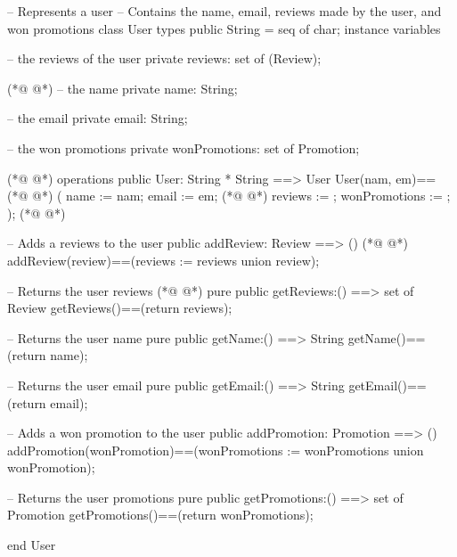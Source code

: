 \begin{vdmpp}[breaklines=true]
-- Represents a user
-- Contains the name, email, reviews made by the user, and won promotions
class User
 types 
  public String = seq of char;
 instance variables
 
  -- the reviews of the user
   private reviews: set of (Review);
   
(*@
\label{User:11}
@*)
   -- the name
   private name: String;
   
   -- the email
   private email: String;
   
   -- the won promotions
   private wonPromotions: set of Promotion;
  
(*@
\label{addReview:20}
@*)
 operations
  public User: String * String ==> User
  User(nam, em)==
(*@
\label{getReviews:23}
@*)
  (
   name := nam;
   email := em;
(*@
\label{getName:26}
@*)
   reviews := {};
   wonPromotions := {};
  );
(*@
\label{getEmail:29}
@*)
 
  -- Adds a reviews to the user
  public addReview: Review ==> ()
(*@
\label{addPromotion:32}
@*)
  addReview(review)==(reviews := reviews union {review});

  -- Returns the user reviews
(*@
\label{getPromotions:35}
@*)
  pure public getReviews:() ==> set of Review
  getReviews()==(return reviews);
  
  -- Returns the user name
  pure public getName:() ==> String
  getName()==(return name);
  
  -- Returns the user email
  pure public getEmail:() ==> String
  getEmail()==(return email);
  
  -- Adds a won promotion to the user
  public addPromotion: Promotion ==> ()
  addPromotion(wonPromotion)==(wonPromotions := wonPromotions union {wonPromotion});
  
  -- Returns the user promotions
  pure public getPromotions:() ==> set of Promotion
  getPromotions()==(return wonPromotions);

end User
\end{vdmpp}
